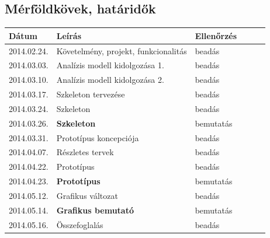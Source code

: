 \subsection{Mérföldkövek, határidők}
\begin{longtable}{| l | p{7cm} | l | l | l | l |}
\hline
\textbf{Dátum} & \textbf{Leírás} & \textbf{Ellenőrzés} \tabularnewline
\hline\hline
2014.02.24. & Követelmény, projekt, funkcionalitás & beadás \tabularnewline
\hline
2014.03.03. & Analízis modell kidolgozása 1. & beadás \tabularnewline
\hline
2014.03.10. & Analízis modell kidolgozása 2. & beadás \tabularnewline
\hline
2014.03.17. & Szkeleton tervezése & beadás \tabularnewline
\hline
2014.03.24. & Szkeleton & beadás \tabularnewline
\hline
2014.03.26. & \textbf{Szkeleton} & bemutatás \tabularnewline
\hline
2014.03.31. & Prototípus koncepciója & beadás \tabularnewline
\hline
2014.04.07. & Részletes tervek & beadás \tabularnewline
\hline
2014.04.22. & Prototípus & beadás \tabularnewline
\hline
2014.04.23. & \textbf{Prototípus} & bemutatás \tabularnewline
\hline
2014.05.12. & Grafikus változat & beadás \tabularnewline
\hline
2014.05.14. & \textbf{Grafikus bemutató} & bemutatás \tabularnewline
\hline
2014.05.16. & Összefoglalás & beadás \tabularnewline
\hline
\end{longtable}

